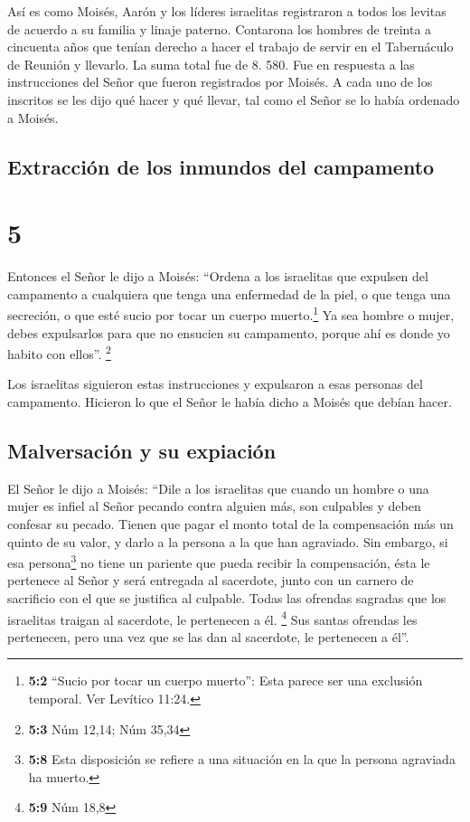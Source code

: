  Así es como Moisés, Aarón y los líderes israelitas
registraron a todos los levitas de acuerdo a su familia y linaje
paterno.  Contarona los hombres de treinta a cincuenta
años que tenían derecho a hacer el trabajo de servir en el Tabernáculo
de Reunión y llevarlo.  La suma total fue de 8. 580.
 Fue en respuesta a las instrucciones del Señor que
fueron registrados por Moisés. A cada uno de los inscritos se les dijo
qué hacer y qué llevar, tal como el Señor se lo había ordenado a Moisés.

\hypertarget{extracciuxf3n-de-los-inmundos-del-campamento}{%
\subsection{Extracción de los inmundos del
campamento}\label{extracciuxf3n-de-los-inmundos-del-campamento}}

\hypertarget{section-4}{%
\section{5}\label{section-4}}

 Entonces el Señor le dijo a Moisés: 
``Ordena a los israelitas que expulsen del campamento a cualquiera que
tenga una enfermedad de la piel, o que tenga una secreción, o que esté
sucio por tocar un cuerpo muerto.\footnote{\textbf{5:2} ``Sucio por
  tocar un cuerpo muerto'': Esta parece ser una exclusión temporal. Ver
  Levítico 11:24.}  Ya sea hombre o mujer, debes
expulsarlos para que no ensucien su campamento, porque ahí es donde yo
habito con ellos''. \footnote{\textbf{5:3} Núm 12,14; Núm 35,34}

 Los israelitas siguieron estas instrucciones y expulsaron
a esas personas del campamento. Hicieron lo que el Señor le había dicho
a Moisés que debían hacer.

\hypertarget{malversaciuxf3n-y-su-expiaciuxf3n}{%
\subsection{Malversación y su
expiación}\label{malversaciuxf3n-y-su-expiaciuxf3n}}

 El Señor le dijo a Moisés:  ``Dile a los
israelitas que cuando un hombre o una mujer es infiel al Señor pecando
contra alguien más, son culpables  y deben confesar su
pecado. Tienen que pagar el monto total de la compensación más un quinto
de su valor, y darlo a la persona a la que han agraviado. 
Sin embargo, si esa persona\footnote{\textbf{5:8} Esta disposición se
  refiere a una situación en la que la persona agraviada ha muerto.} no
tiene un pariente que pueda recibir la compensación, ésta le pertenece
al Señor y será entregada al sacerdote, junto con un carnero de
sacrificio con el que se justifica al culpable.  Todas las
ofrendas sagradas que los israelitas traigan al sacerdote, le pertenecen
a él. \footnote{\textbf{5:9} Núm 18,8}  Sus santas
ofrendas les pertenecen, pero una vez que se las dan al sacerdote, le
pertenecen a él''.

